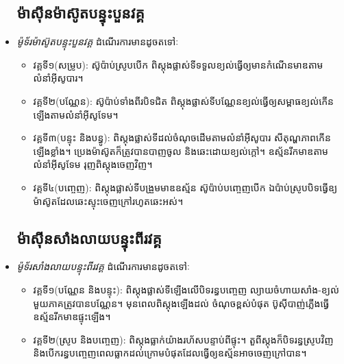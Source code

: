 \begin{itemize}
    		\subsection{ម៉ាសុីនម៉ាស៊ូតបន្ទុះបួនវគ្គ}
    		\item \emph{\kml ម៉ូទ័រម៉ាស៊ូតបន្ទុះបួនវគ្គ} ដំណើរការមានដូចតទៅៈ 
    		\begin{itemize}
    			\item វគ្គទី១(សម្រូប): ស៊ូប៉ាប់ស្រូបបើក ពិស្តុងផ្លាស់ទីទទួលខ្យល់ធ្វើឲ្យមានកំណើនមាឌតាមលំនាំអុីសូបារ។
    			\item វគ្គទី២(បណ្ណែន): ស៊ូប៉ាប់ទាំងពីរបិទជិត ពិស្តុងផ្លាស់ទីបណ្ណែនខ្យល់ធ្វើឲ្យសម្ពាធខ្យល់កើនឡើងតាមលំនាំអុីសូទែម។
    			\item វគ្គទី៣(បន្ទុះ និងបន្ធូ): ពិស្តុងផ្លាស់ទីដល់ចំណុចដើមតាមលំនាំអុីសូបារ សីតុណ្ហភាពកើនឡើងខ្លាំង។ ប្រេងម៉ាស៊ូតក៏ត្រូវបានបាញចូល និងឆេះដោយខ្យល់ក្តៅ។ ឧស្ម័នរីកមាឌតាមលំនាំអុីសូទែម រុញពិស្តុងចេញវិញ។
    			\item វគ្គទី៤(បញ្ចេញ): ពិស្តុងផ្លាស់ទីបង្រួមមាឌឧស្ម័ន ស៊ូប៉ាប់បញ្ចេញបើក ឯប៉ាប់ស្រូបបិទធ្វើឧ្យម៉ាស៊ូតដែលឆេះស្ទុះចេញក្រៅរហូតឆេះអស់។
    		\end{itemize}
    		\subsection{ម៉ាសុីនសាំងលាយបន្ទុះពីរវគ្គ}
    		\item \emph{\kml ម៉ូទ័រសាំងលាយបន្ទុះពីរវគ្គ} ដំណើរការមានដូចតទៅៈ
    		\begin{itemize}
    			\item វគ្គទី១(បណ្ណែន និងបន្ទុះ): ពិស្តុងផ្លាស់ទីឡើងលើបិទរន្ធបញ្ចេញ ល្យាយចំហាយសាំង-ខ្យល់មួយភាគត្រូវបានបណ្ណែន។ មុនពេលពិស្តុងឡើងដល់ ចំណុចខ្ពស់បំផុត ប៊ូសុីបាញ់ភ្លើងធ្វើឧស្ម័នរីកមាឌផ្ទុះឡើង។
    			\item វគ្គទី២(ស្រូប និងបញ្ចេញ): ពិស្តុងធ្លាក់យ៉ាងរហ័សបន្ទាប់ពីផ្ទុះ។ តួពីស្តុងក៏បិទរន្ធស្រូបវិញ និងបើករន្ធបញ្ចេញពេលធ្លាកដល់ក្រោមបំផុតដែលធ្វើឲ្យឧស្ម័នអាចចេញក្រៅបាន។
    		\end{itemize}

\end{itemize}

